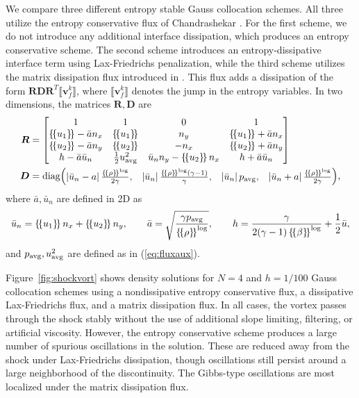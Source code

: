 \documentclass[review,onefignum,onetabnum,final]{siamart171218}
\newcommand{\LRb}[1]{\left| #1 \right|}
\newcommand{\LRc}[1]{\left\{ #1 \right\}}
\newcommand{\jump}[1] {\ensuremath{\llbracket#1\rrbracket}}
\newcommand{\avg}[1] {\ensuremath{\LRc{\!\{#1\}\!}}}
\begin{document}
We compare three different entropy stable Gauss collocation schemes.  All three utilize the entropy conservative flux of Chandrashekar \cite{chandrashekar2013kinetic}.  For the first scheme, we do not introduce any additional interface dissipation, which produces an entropy conservative scheme.  The second scheme introduces an entropy-dissipative interface term using Lax-Friedrichs penalization, while the third scheme utilizes the matrix dissipation flux introduced in \cite{winters2017uniquely}.  This flux adds a dissipation of the form $\bm{R}\bm{D}\bm{R}^T\jump{{\bm{v}}^k_f}$, where $\jump{{\bm{v}}^k_f}$ denotes the jump in the entropy variables.  In two dimensions, the matrices $\bm{R}, \bm{D}$ are 
\begin{align*}
\bm{R} &= \begin{bmatrix}
1 & 1 & 0 & 1\\
\avg{u_1}-\bar{a} n_x & \avg{u_1} & n_y & \avg{u_1}+\bar{a} n_x\\
\avg{u_2}-\bar{a} n_y & \avg{u_2} & -n_x & \avg{u_2}+\bar{a} n_y\\
h-\bar{a} \bar{u}_n & \frac{1}{2}u^2_{\rm avg} & \bar{u}_n n_y - \avg{u_2}n_x & h + \bar{a} \bar{u}_n
\end{bmatrix}\\
\bm{D} &= {\rm diag}{\begin{pmatrix}
\LRb{\bar{u}_n - a}\frac{\avg{\rho}^{\log}}{2\gamma}, & \LRb{\bar{u}_n}\frac{\avg{\rho}^{\log}(\gamma-1)}{\gamma}, & \LRb{\bar{u}_n}p_{\rm avg}, & \LRb{\bar{u}_n + a}\frac{\avg{\rho}^{\log}}{2\gamma} \end{pmatrix}},
\end{align*}
where $\bar{a}, \bar{u}_n$ are defined in 2D as
\begin{gather*}
\bar{u}_n = \avg{u_1}n_x + \avg{u_2}n_y, \qquad \bar{a} = \sqrt{\frac{\gamma p_{\rm avg}}{\avg{\rho}^{\log}}}, \qquad h = \frac{\gamma}{2(\gamma-1)\avg{\beta}^{\log}} + \frac{1}{2}\bar{u}, 
\end{gather*}
and $p_{\rm avg}, u^2_{\rm avg}$ are defined as in (\ref{eq:fluxaux}).  

Figure~\ref{fig:shockvort} shows density solutions for $N=4$ and $h = 1/100$ Gauss collocation schemes using a nondissipative entropy conservative flux, a dissipative Lax-Friedrichs flux, and a matrix dissipation flux.  In all cases, the vortex passes through the shock stably without the use of additional slope limiting, filtering, or artificial viscosity.  However, the entropy conservative scheme produces a large number of spurious oscillations in the solution.  These are reduced away from the shock under Lax-Friedrichs dissipation, though oscillations still persist around a large neighborhood of the discontinuity.  The Gibbs-type oscillations are most localized under the matrix dissipation flux.  
\end{document}
